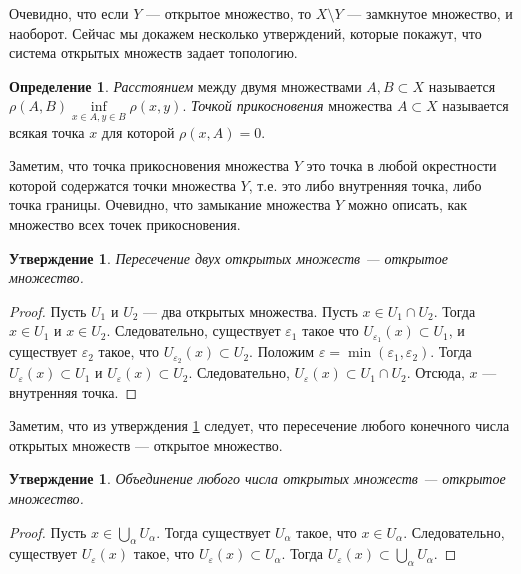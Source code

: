 \documentclass[12pt, titlepage, oneside]{amsbook}
\newtheorem{claim}[theorem]{Утверждение}
\theoremstyle{definition}
\newtheorem{definition}[theorem]{Определение}
\theoremstyle{remark}
\begin{document}
Очевидно, что если $Y$ --- открытое множество, то $X\setminus Y$ --- замкнутое множество, и наоборот.
Сейчас мы докажем несколько утверждений, которые покажут, что система открытых множеств задает топологию.

\begin{definition}
	\emph{Расстоянием} между двумя множествами $A,B\subset X$ называется $\rho(A,B)\inf\limits_{x\in A,y\in B}\rho(x,y)$. \emph{Точкой прикосновения} множества $A\subset X$ называется всякая точка $x$ для которой $\rho(x,A)=0$.
\end{definition}

Заметим, что точка прикосновения множества $Y$ это точка в любой окрестности которой содержатся точки множества $Y$, т.е. это либо внутренняя точка, либо точка границы. Очевидно, что замыкание множества $Y$ можно описать, как множество всех точек прикосновения.

\begin{claim}
	\label{Met2}
	Пересечение двух открытых множеств --- открытое множество.
\end{claim}

\begin{proof}
	Пусть $U_1$ и $U_2$ --- два открытых множества. Пусть $x\in U_1\cap U_2$. Тогда $x\in U_1$ и $x\in U_2$. Следовательно, существует $\varepsilon_1$ такое что $U_{\varepsilon_1}(x)\subset U_1$, и существует $\varepsilon_2$ такое, что $U_{\varepsilon_2}(x)\subset U_2$. Положим $\varepsilon=\min(\varepsilon_1,\varepsilon_2)$. Тогда $U_{\varepsilon}(x)\subset U_1$ и $U_{\varepsilon}(x)\subset U_2$. Следовательно, $U_{\varepsilon}(x)\subset U_1\cap U_2$. Отсюда, $x$ --- внутренняя точка.
\end{proof}

Заметим, что из утверждения \ref{Met2} следует, что пересечение любого конечного числа открытых множеств --- открытое множество.

\begin{claim}
	\label{Met3}
	Объединение любого числа открытых множеств --- открытое множество.
\end{claim}

\begin{proof}
	Пусть $x\in\bigcup\limits_{\alpha} U_\alpha$. Тогда существует $U_\alpha$ такое, что $x\in U_\alpha$. Следовательно, существует $U_{\varepsilon}(x)$ такое, что $U_{\varepsilon}(x)\subset U_\alpha$. Тогда $U_{\varepsilon}(x)\subset \bigcup\limits_{\alpha} U_\alpha$.
\end{proof}
\end{document}
